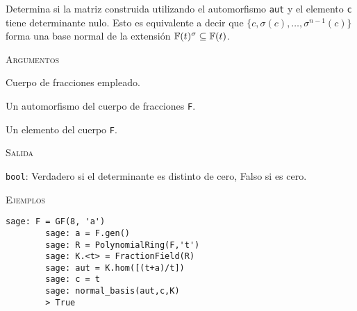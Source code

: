 \begin{description}[leftmargin=1em, font=\ttfamily, style=nextline]
    \item[normal\_basis(aut, c, F)]
        
    Determina si la matriz construida utilizando el automorfismo \texttt{aut} y el elemento \texttt{c} tiene determinante nulo. Esto es equivalente a decir que $\{c,\sigma(c),\dots,\sigma^{n-1}(c)\}$ forma una base normal de la extensión $\mathbb{F}(t)^\sigma \subseteq \mathbb{F}(t)$.
    
    \textsc{Argumentos}
    
    \begin{description}[font=\normalfont\ttfamily]
        \item[F] Cuerpo de fracciones empleado.
        \item[automorphism] Un automorfismo del cuerpo de fracciones \texttt{F}.
        \item[c] Un elemento del cuerpo \texttt{F}.
    \end{description}
    
    \textsc{Salida}
    
    \begin{description}[font=\normalfont\ttfamily]
        \item[] \texttt{bool}: Verdadero si el determinante es distinto de cero, Falso si es cero.
    \end{description}

    \textsc{Ejemplos}

    \begin{lstlisting}[gobble=8]
        sage: F = GF(8, 'a')
        sage: a = F.gen()
        sage: R = PolynomialRing(F,'t')
        sage: K.<t> = FractionField(R)
        sage: aut = K.hom([(t+a)/t])
        sage: c = t
        sage: normal_basis(aut,c,K)
        > True
    \end{lstlisting}  


\end{description} 

